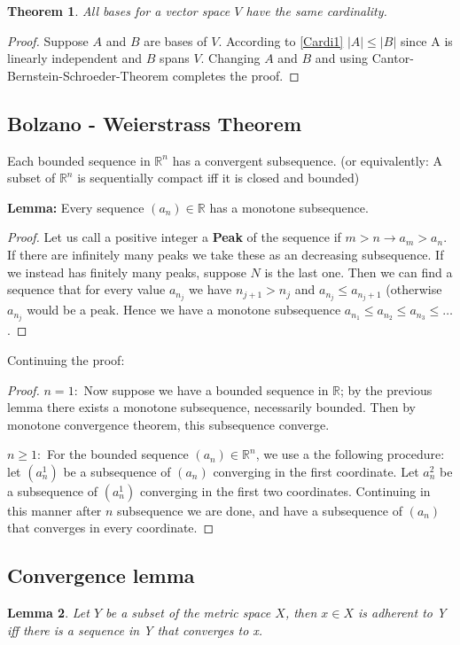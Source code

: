 \documentclass[titlepage]{article}
\newtheorem{thm}{Theorem}[section]
\newtheorem{lem}[thm]{Lemma}
\begin{document}
\begin{thm}
All bases for a vector space $V$ have the same cardinality.
\end{thm}
\begin{proof}
Suppose $A$ and $B$ are bases of $V$. According to \eqref{Cardi1} $|A| \leq |B|$ since A is linearly independent and $B$ spans $V$. Changing $A$ and $B$ and using Cantor-Bernstein-Schroeder-Theorem completes the proof.
\end{proof}





\subsection{Bolzano - Weierstrass Theorem}
Each bounded sequence in $\mathbb{R}^n$ has a convergent subsequence. 
(or equivalently: A subset of $\mathbb{R}^n$ is sequentially compact iff it is closed and bounded)

\textbf{Lemma:}
Every sequence $(a_n) \in \mathbb{R}$ has a monotone subsequence.
\begin{proof}

Let us call a positive integer a \textbf{Peak} of the sequence if $m>n \rightarrow a_m>a_n$. If there are infinitely many peaks we take these as an decreasing subsequence.
If we instead has finitely many peaks, suppose $N$ is the last one. Then we can find a sequence that for every value $a_{n_j}$ we have 
$n_{j+1} > n_j$ and $a_{n_j} \leq a_{n_j+1}$ (otherwise $a_{n_j}$ would be a peak. Hence we have a monotone subsequence $a_{n_1} \leq a_{n_2} \leq a_{n_3} \leq \ldots $.
\end{proof}
Continuing the proof:
\begin{proof}
$n= 1:$ Now suppose we have a bounded sequence in $\mathbb{R}$; by the previous lemma there exists a monotone subsequence, necessarily bounded. Then by monotone convergence theorem, this subsequence converge.

$n \geq 1: $ For the bounded sequence $(a_n) \in \mathbb{R}^n$, we use a the following procedure:
let $(a_n^1)$ be a subsequence of $(a_n)$  converging in the first coordinate. Let $a_n^2$ be a subsequence of  $(a_n^1)$ converging in the first two coordinates. Continuing in this manner after $n$ subsequence we are done, and have a subsequence of $(a_n)$ that converges in every coordinate.
\end{proof}


\subsection{Convergence lemma}
\begin{lem}
Let $Y$ be a subset of the metric space $X$, then $x\in X$ is adherent to Y iff there is a sequence in Y that converges to x.
\end{lem}
\end{document}
